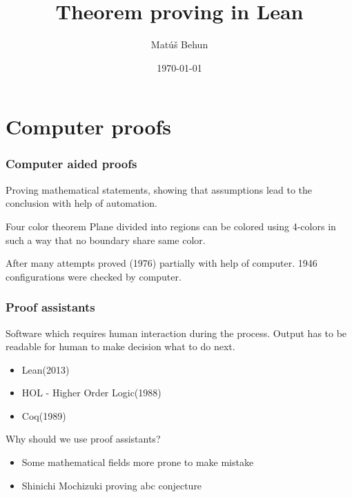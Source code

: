 \documentclass{beamer}
\title[]{Theorem proving in Lean} %
\author{Mat\'u\v{s} Behun} %
\institute[STU] %
{
Slovak University of Technology in Bratislava \\ %
\medskip
}
\date{\today} %
\begin{document}
\begin{frame}
\titlepage 
\end{frame}
\section{Computer proofs}
\begin{frame}
    \frametitle{Computer aided proofs}
    Proving mathematical statements, showing that assumptions lead to the
    conclusion with help of automation.
    \begin{block}{Four color theorem}
        Plane divided into regions can be colored using 4-colors in  such a way
        that no boundary share same color.
    \end{block}
    After many attempts proved (1976) partially with help of computer. 1946
    configurations were checked by computer.
\end{frame}
\begin{frame}
    \frametitle{Proof assistants}
    Software which requires human interaction during the process. Output has to
    be readable for human to make decision what to do next.
    \begin{itemize}
        \item Lean(2013) \\
        \item HOL - Higher Order Logic(1988) \\
        \item Coq(1989)
    \end{itemize}
    Why should we use proof assistants?
    \begin{itemize}
        \item Some mathematical fields more prone to make mistake \\
        \item Shinichi Mochizuki proving abc conjecture \\
    \end{itemize}
\end{frame}
\end{document}

